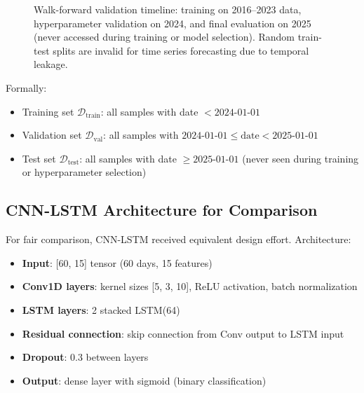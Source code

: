 \documentclass[conference]{IEEEtran}
\begin{document}
\begin{figure}[htbp]
\centering
{}
\caption{Walk-forward validation timeline: training on 2016--2023 data, hyperparameter validation on 2024, and final evaluation on 2025 (never accessed during training or model selection). Random train-test splits are invalid for time series forecasting due to temporal leakage.}
\label{fig:validation_timeline}
\end{figure}

Formally:
\begin{itemize}
\item Training set $\mathcal{D}_{\text{train}}$: all samples with date $< 2024\text{-}01\text{-}01$
\item Validation set $\mathcal{D}_{\text{val}}$: all samples with $2024\text{-}01\text{-}01 \leq \text{date} < 2025\text{-}01\text{-}01$
\item Test set $\mathcal{D}_{\text{test}}$: all samples with date $\geq 2025\text{-}01\text{-}01$ (never seen during training or hyperparameter selection)
\end{itemize}

\subsection{CNN-LSTM Architecture for Comparison}

For fair comparison, CNN-LSTM received equivalent design effort. Architecture:
\begin{itemize}
\item \textbf{Input}: [60, 15] tensor (60 days, 15 features)
\item \textbf{Conv1D layers}: kernel sizes [5, 3, 10], ReLU activation, batch normalization
\item \textbf{LSTM layers}: 2 stacked LSTM(64)
\item \textbf{Residual connection}: skip connection from Conv output to LSTM input
\item \textbf{Dropout}: 0.3 between layers
\item \textbf{Output}: dense layer with sigmoid (binary classification)
\end{itemize}
\end{document}
